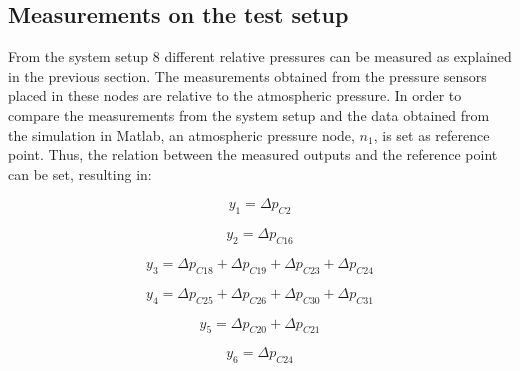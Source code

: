 \subsection{Measurements on the test setup}

From the system setup $8$ different relative pressures can be measured as explained in the previous section. The measurements obtained from the pressure sensors 
placed in these nodes are relative to the atmospheric pressure. In order to compare the measurements from the system setup and the data 
obtained from the simulation in Matlab, an atmospheric pressure node, $n_1$, is set as reference point. Thus, the relation between the measured 
outputs and the reference point can be set, resulting in:

\vspace{4mm}
\begin{equation}
    y_1 = \Delta p_{C2} 
\end{equation}

\vspace{4mm}
\begin{equation}
   y_2 = \Delta p_{C16} 
 \end{equation}

\vspace{4mm}
\begin {equation}
    y_3 = \Delta p_{C18} + \Delta p_{C19} + \Delta p_{C23} + \Delta p_{C24} 
\end{equation}

\vspace{4mm}
\begin {equation}
    y_4 = \Delta p_{C25} + \Delta p_{C26} + \Delta p_{C30} + \Delta p_{C31}  
\end{equation}

\vspace{4mm}
\begin {equation}
    y_5 = \Delta p_{C20} + \Delta p_{C21}
\end{equation}

\vspace{4mm}
\begin {equation}
    y_6 = \Delta p_{C24} 
\end{equation}

